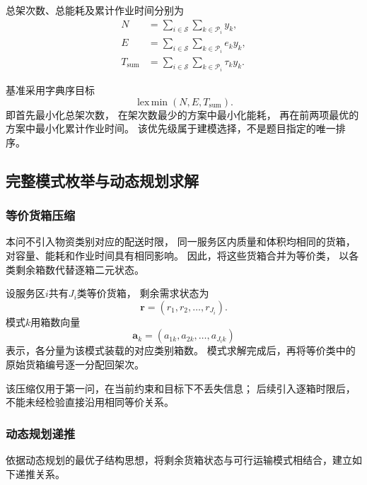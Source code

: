 \documentclass[bwprint]{gmcmthesis}
\begin{document}
总架次数、总能耗及累计作业时间分别为
\begin{align}
    N&=\sum_{i\in\mathcal{S}}
       \sum_{k\in\mathcal{P}_i}y_k,\\
    E&=\sum_{i\in\mathcal{S}}
       \sum_{k\in\mathcal{P}_i}e_k y_k,\\
    T_{\mathrm{sum}}
      &=\sum_{i\in\mathcal{S}}
       \sum_{k\in\mathcal{P}_i}\tau_k y_k.
\end{align}

基准采用字典序目标
\begin{equation}
    \operatorname{lex\,min}
    \left(N,E,T_{\mathrm{sum}}\right).
\label{eq:q1_lex_objective}
\end{equation}
即首先最小化总架次数，
在架次数最少的方案中最小化能耗，
再在前两项最优的方案中最小化累计作业时间。
该优先级属于建模选择，不是题目指定的唯一排序。

\subsection{完整模式枚举与动态规划求解}

\subsubsection{等价货箱压缩}

本问不引入物资类别对应的配送时限，
同一服务区内质量和体积均相同的货箱，
对容量、能耗和作业时间具有相同影响。
因此，将这些货箱合并为等价类，
以各类剩余箱数代替逐箱二元状态。

设服务区$i$共有$J_i$类等价货箱，
剩余需求状态为
\begin{equation}
    \boldsymbol{r}
    =
    (r_1,r_2,\ldots,r_{J_i}).
\end{equation}
模式$k$用箱数向量
\begin{equation}
    \boldsymbol{a}_k
    =
    (a_{1k},a_{2k},\ldots,a_{J_i k})
\end{equation}
表示，各分量为该模式装载的对应类别箱数。
模式求解完成后，再将等价类中的原始货箱编号逐一分配回架次。

该压缩仅用于第一问，在当前约束和目标下不丢失信息；
后续引入逐箱时限后，不能未经检验直接沿用相同等价关系。

\subsubsection{动态规划递推}
依据动态规划的最优子结构思想\cite{bellman1957}，将剩余货箱状态与可行运输模式相结合，建立如下递推关系。
\end{document}
